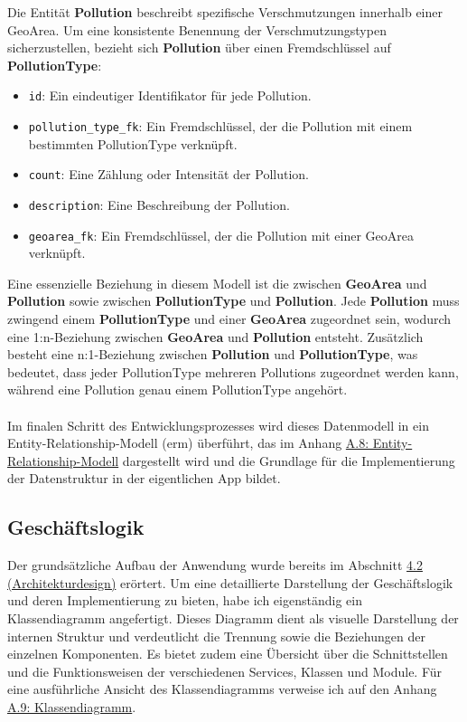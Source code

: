 \documentclass[a4paper,12pt]{article}
\begin{document}
Die Entität \textbf{Pollution} beschreibt spezifische Verschmutzungen innerhalb einer GeoArea. Um eine konsistente Benennung der Verschmutzungstypen sicherzustellen, bezieht sich \textbf{Pollution} über einen Fremdschlüssel auf \textbf{PollutionType}:
\begin{itemize}
    \item \texttt{id}: Ein eindeutiger Identifikator für jede Pollution.
    \item \texttt{pollution\_type\_fk}: Ein Fremdschlüssel, der die Pollution mit einem bestimmten PollutionType verknüpft.
    \item \texttt{count}: Eine Zählung oder Intensität der Pollution.
    \item \texttt{description}: Eine Beschreibung der Pollution.
    \item \texttt{geoarea\_fk}: Ein Fremdschlüssel, der die Pollution mit einer GeoArea verknüpft.
\end{itemize}
Eine essenzielle Beziehung in diesem Modell ist die zwischen \textbf{GeoArea} und \textbf{Pollution} sowie zwischen \textbf{PollutionType} und \textbf{Pollution}. Jede \textbf{Pollution} muss zwingend einem \textbf{PollutionType} und einer \textbf{GeoArea} zugeordnet sein, wodurch eine 1:n-Beziehung zwischen \textbf{GeoArea} und \textbf{Pollution} entsteht. Zusätzlich besteht eine n:1-Beziehung zwischen \textbf{Pollution} und \textbf{PollutionType}, was bedeutet, dass jeder PollutionType mehreren Pollutions zugeordnet werden kann, während eine Pollution genau einem PollutionType angehört.\\
\\
Im finalen Schritt des Entwicklungsprozesses wird dieses Datenmodell in ein Entity-Relationship-Modell (\acrshort{erm}) überführt, das im Anhang \hyperref[sec:entity-relationship-modell]{A.8: Entity-Relationship-Modell} dargestellt wird und die Grundlage für die Implementierung der Datenstruktur in der eigentlichen App bildet.


\subsection{Geschäftslogik}
Der grundsätzliche Aufbau der Anwendung wurde bereits im Abschnitt \hyperref[sec:architekturdesign]{4.2 (Architekturdesign)} erörtert. Um eine detaillierte Darstellung der Geschäftslogik und deren Implementierung zu bieten, habe ich eigenständig ein Klassendiagramm angefertigt. Dieses Diagramm dient als visuelle Darstellung der internen Struktur und verdeutlicht die Trennung sowie die Beziehungen der einzelnen Komponenten. Es bietet zudem eine Übersicht über die Schnittstellen und die Funktionsweisen der verschiedenen Services, Klassen und Module. Für eine ausführliche Ansicht des Klassendiagramms verweise ich auf den Anhang \hyperref[sec:klassendiagramm]{A.9: Klassendiagramm}.
\end{document}
